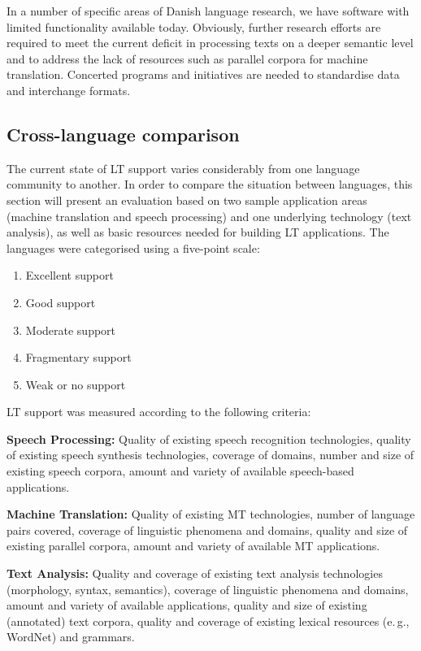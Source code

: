 \begin{multicols}{2}
In a number of specific areas of Danish language research, we have software with limited functionality available today. Obviously, further research efforts are required to meet the current deficit in processing texts on a deeper semantic level and to address the lack of resources such as parallel corpora for machine translation.  Concerted programs and initiatives are needed to standardise data and interchange formats.

\subsection{Cross-language comparison}

The current state of LT support varies considerably from one language
community to another. In order to compare the situation between
languages, this section will present an evaluation based on two sample
application areas (machine translation and speech processing) and one
underlying technology (text analysis), as well as basic resources
needed for building LT applications. The languages were categorised
using a five-point scale: 

\begin{enumerate}
\item Excellent support
\item Good support
\item Moderate support
\item Fragmentary support
\item Weak or no support
\end{enumerate}

LT support was measured according to the following criteria:

\textbf{Speech Processing:} Quality of existing speech recognition technologies, quality of existing speech synthesis technologies, coverage of domains, number and size of existing speech corpora, amount and variety of available speech-based applications.

\textbf{Machine Translation:} Quality of existing MT technologies, number of language pairs covered, coverage of linguistic phenomena and domains, quality and size of existing parallel corpora, amount and variety of available MT applications.

\textbf{Text Analysis:} Quality and coverage of existing text analysis technologies (morphology, syntax, semantics), coverage of linguistic phenomena and domains, amount and variety of available applications, quality and size of existing (annotated) text corpora, quality and coverage of existing lexical resources (e.\,g., WordNet) and grammars.


\end{multicols}
